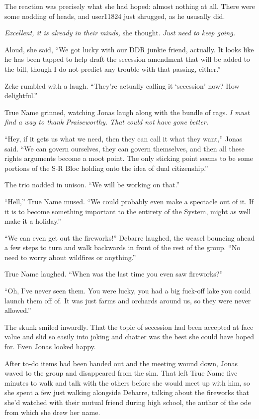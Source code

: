 The reaction was precisely what she had hoped: almost nothing at all. There were some nodding of heads, and user11824 just shrugged, as he ususally did.

\emph{Excellent, it is already in their minds,} she thought. \emph{Just need to keep going.}

Aloud, she said, ``We got lucky with our DDR junkie friend, actually. It looks like he has been tapped to help draft the secession amendment that will be added to the bill, though I do not predict any trouble with that passing, either.''

Zeke rumbled with a laugh. ``They're actually calling it `secession' now? How delightful.''

True Name grinned, watching Jonas laugh along with the bundle of rags. \emph{I must find a way to thank Praiseworthy. That could not have gone better.}

``Hey, if it gets us what we need, then they can call it what they want,'' Jonas said. ``We can govern ourselves, they can govern themselves, and then all these rights arguments become a moot point. The only sticking point seems to be some portions of the S-R Bloc holding onto the idea of dual citizenship.''

The trio nodded in unison. ``We will be working on that.''

``Hell,'' True Name mused. ``We could probably even make a spectacle out of it. If it is to become something important to the entirety of the System, might as well make it a holiday.''

``We can even get out the fireworks!'' Debarre laughed, the weasel bouncing ahead a few steps to turn and walk backwards in front of the rest of the group. ``No need to worry about wildfires or anything.''

True Name laughed. ``When was the last time you even saw fireworks?''

``Oh, I've never seen them. You were lucky, you had a big fuck-off lake you could launch them off of. It was just farms and orchards around us, so they were never allowed.''

The skunk smiled inwardly. That the topic of secession had been accepted at face value and slid so easily into joking and chatter was the best she could have hoped for. Even Jonas looked happy.

After to-do items had been handed out and the meeting wound down, Jonas waved to the group and disappeared from the sim. That left True Name five minutes to walk and talk with the others before she would meet up with him, so she spent a few just walking alongside Debarre, talking about the fireworks that she'd watched with their mutual friend during high school, the author of the ode from which she drew her name.


